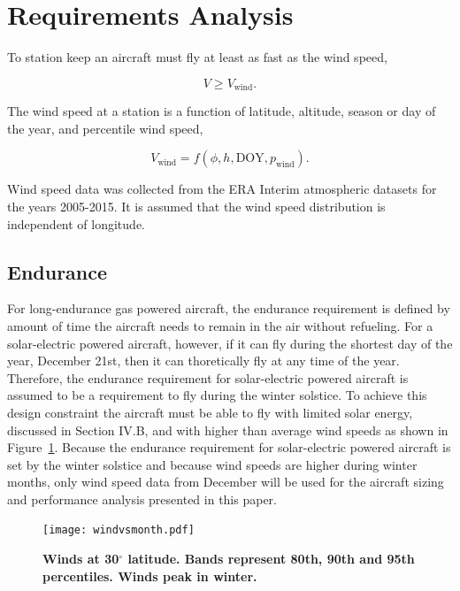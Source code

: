 \section{Requirements Analysis}

To station keep an aircraft must fly at least as fast as the wind speed,

\begin{equation}
    \label{e:availreq}
    V \geq V_{\text{wind}}.
\end{equation}

The wind speed at a station is a function of latitude, altitude, season or day of the year, and percentile wind speed,

\begin{equation}
    \label{e:windspeed}
    V_{\text{wind}} = f(\phi, h, \text{DOY}, p_{\text{wind}}).
    \end{equation}

Wind speed data was collected from the ERA Interim atmospheric datasets for the years 2005-2015.\cite{wind} 
It is assumed that the wind speed distribution is independent of longitude. 

\subsection{Endurance}

For long-endurance gas powered aircraft, the endurance requirement is defined by amount of time the aircraft needs to remain in the air without refueling.  
For a solar-electric powered aircraft, however, if it can fly during the shortest day of the year, December 21st, then it can thoretically fly at any time of the year.  
Therefore, the endurance requirement for solar-electric powered aircraft is assumed to be a requirement to fly during the winter solstice.  
To achieve this design constraint the aircraft must be able to fly with limited solar energy, discussed in Section IV.B, and with higher than average wind speeds as shown in Figure~\ref{f:windvsmonth}.  
Because the endurance requirement for solar-electric powered aircraft is set by the winter solstice and because wind speeds are higher during winter months, only wind speed data from December will be used for the aircraft sizing and performance analysis presented in this paper. 

\begin{figure}[H]
	\begin{center}
	\texttt{[image: windvsmonth.pdf]}
    \caption{\textbf{Winds at 30$^{\circ}$ latitude.  Bands represent 80th, 90th and 95th percentiles. Winds peak in winter.}}
	\label{f:windvsmonth}
	\end{center}
\end{figure}

